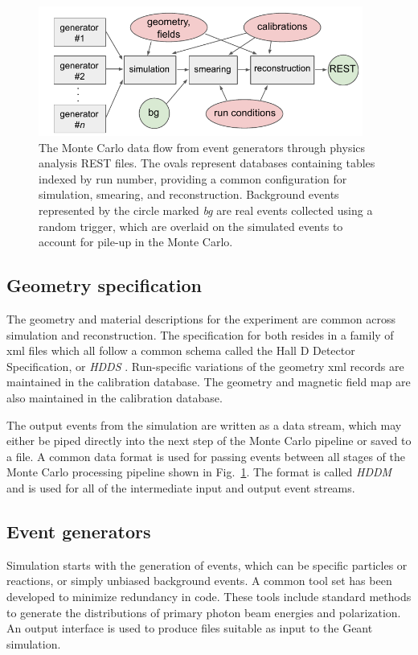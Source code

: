 \begin{figure}[t]\centering
\includegraphics[width=0.95\textwidth]{figures/MonteCarlo_flow.pdf}
\caption[]{\label{fig:MC-data-flow}The Monte Carlo data flow from event generators through physics analysis REST files. The ovals represent databases containing tables indexed by run number, providing a common configuration for simulation, smearing, and reconstruction. Background events represented by the circle marked \emph{bg} are real events collected using a random trigger, which are overlaid on the simulated events to account for pile-up in the Monte Carlo.}
\end{figure}

\subsection[Geometry specification]{\label{sec:materialscan}Geometry specification}
The geometry and material descriptions for the experiment are common across simulation and reconstruction. The specification for both resides in a family of xml files which all follow a common schema called the Hall D Detector Specification, or \emph{HDDS} \cite{CITATION??}. Run-specific variations of the geometry xml records are maintained in the calibration database. The geometry and magnetic field map are also maintained in the calibration database.

The output events from the simulation are written as a data stream, which may either be piped directly into the next step of the Monte Carlo pipeline or saved to a file. A common data format is used for passing events between all stages of the Monte Carlo processing pipeline shown in Fig.~\ref{fig:MC-data-flow}. The format is called {\em HDDM} and is used for all of the intermediate input and output event streams.

\subsection{Event generators \label{sec:generators}}
Simulation starts with the generation of events, which can be specific particles or reactions, or simply unbiased background events. A common tool set has been developed to minimize redundancy in code. These tools include standard methods to generate the distributions of primary photon beam energies and polarization. An output interface is used to produce files suitable as input to the Geant simulation.

